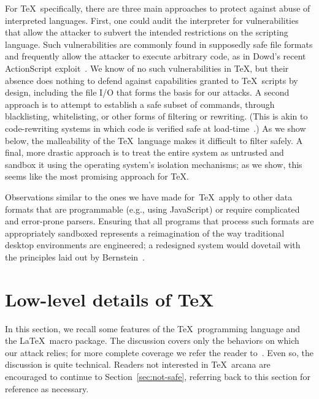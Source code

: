 \documentclass[nofontenc,pagenumbers,letterpaper,tight,twocolumn]{usenix09}
\begin{document}
For \TeX\ specifically, there are three main approaches to protect
against abuse of interpreted languages. First, one could audit the
interpreter for vulnerabilities that allow the attacker to subvert the
intended restrictions on the scripting language.  Such vulnerabilities
are commonly found in supposedly safe file formats and frequently
allow the attacker to execute arbitrary code, as in Dowd's recent
ActionScript exploit~\cite{Dow08}.  We know of no such vulnerabilities
in \TeX, but their absence does nothing to defend against capabilities
granted to \TeX\ scripts by design, including the file I/O that forms
the basis for our attacks.  A second approach is to attempt to
establish a safe subset of commands, through blacklisting,
whitelisting, or other forms of filtering or rewriting.  (This is akin
to code-rewriting systems in which code is verified safe at
load-time~\cite{necula-lee:pcc:osdi96}.)  As we show below, the
malleability of the \TeX\ language makes it difficult to filter
safely.  A final, more drastic approach is to treat the entire system
as untrusted and sandbox it using the operating system's isolation
mechanisms; as we show, this seems like the most promising approach
for \TeX.

Observations similar to the ones we have made for~\TeX\ apply to other
data formats that are programmable (e.g., using JavaScript) or
require complicated and error-prone parsers.  Ensuring that all
programs that process such formats are appropriately sandboxed
represents a reimagination of the way traditional desktop environments
are engineered; a redesigned system would dovetail with the principles
laid out by Bernstein~\cite{djb:qmail-retrospective:csaw07}.

\section[Low-level details of TeX]{Low-level details of \TeX}
\label{sec:tech}
In this section, we recall some features of the \TeX\ programming
language and the \LaTeX\ macro package. The discussion covers only the
behaviors on which our attack relies; for more complete coverage we
refer the reader to~\cite{knuth,src,etexum}. Even so, the discussion
is quite technical. Readers not interested in \TeX\ arcana are
encouraged to continue to Section~\ref{sec:not-safe}, referring back to
this section for reference as necessary.
\end{document}
